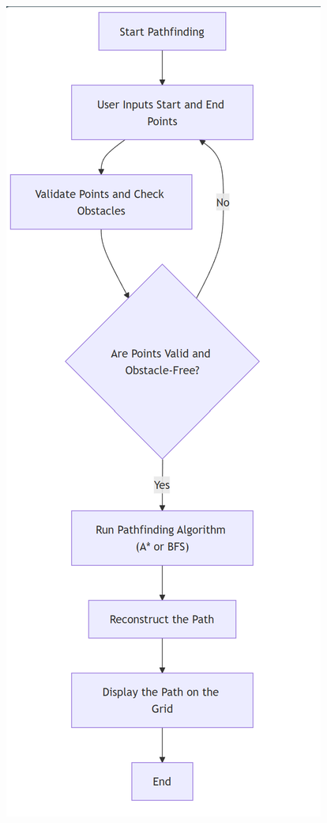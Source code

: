 \begin{figure}[!htbp]
	\centering %
	
	\begin{minipage}{0.48\textwidth} %
		\centering
		\includegraphics[width=\linewidth]{Images/pfoutline.png} %

\end{minipage}
\end{figure}
